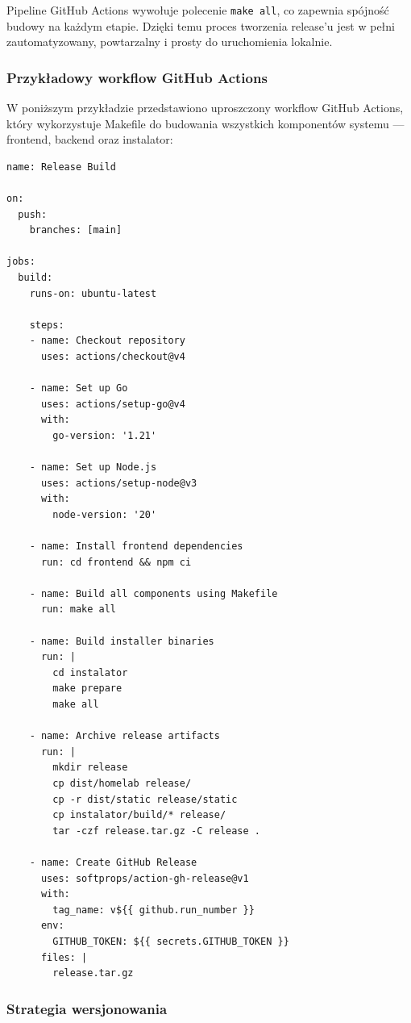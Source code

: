 Pipeline GitHub Actions wywołuje polecenie \texttt{make all}, co zapewnia spójność budowy na każdym etapie. Dzięki temu proces tworzenia release’u jest w pełni zautomatyzowany, powtarzalny i prosty do uruchomienia lokalnie.

\subsubsection{Przykładowy workflow GitHub Actions}

W poniższym przykładzie przedstawiono uproszczony workflow GitHub Actions, który wykorzystuje Makefile do budowania wszystkich komponentów systemu — frontend, backend oraz instalator:

\begin{verbatim}
name: Release Build

on:
  push:
    branches: [main]

jobs:
  build:
    runs-on: ubuntu-latest

    steps:
    - name: Checkout repository
      uses: actions/checkout@v4

    - name: Set up Go
      uses: actions/setup-go@v4
      with:
        go-version: '1.21'

    - name: Set up Node.js
      uses: actions/setup-node@v3
      with:
        node-version: '20'

    - name: Install frontend dependencies
      run: cd frontend && npm ci

    - name: Build all components using Makefile
      run: make all

    - name: Build installer binaries
      run: |
        cd instalator
        make prepare
        make all

    - name: Archive release artifacts
      run: |
        mkdir release
        cp dist/homelab release/
        cp -r dist/static release/static
        cp instalator/build/* release/
        tar -czf release.tar.gz -C release .

    - name: Create GitHub Release
      uses: softprops/action-gh-release@v1
      with:
        tag_name: v${{ github.run_number }}
      env:
        GITHUB_TOKEN: ${{ secrets.GITHUB_TOKEN }}
      files: |
        release.tar.gz
\end{verbatim}

\subsubsection{Strategia wersjonowania}

